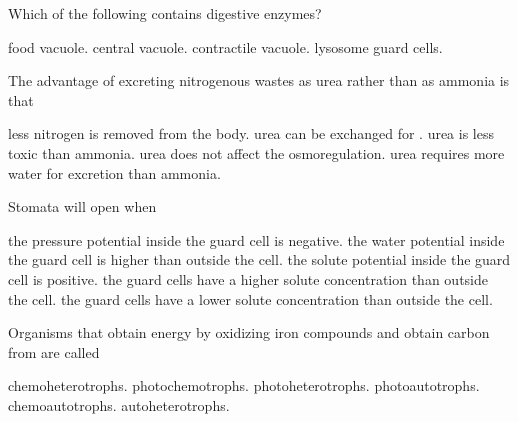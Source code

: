 \question
Which of the following contains digestive enzymes?

\begin{choices}
\choice food vacuole. 
\choice central vacuole. 
\choice contractile vacuole. 
\correctchoice lysosome 
\choice guard cells. 
\end{choices}

\question
The advantage of excreting nitrogenous wastes as urea rather than as ammonia is that

\begin{choices}
\choice less nitrogen is removed from the body. 
\choice urea can be exchanged for . 
\correctchoice urea is less toxic than ammonia. 
\choice urea does not affect the osmoregulation. 
\choice urea requires more water for excretion than ammonia. 
\end{choices}

\question
Stomata will open when  

\begin{choices}
\choice the pressure potential inside the guard cell is negative. 
\choice the water potential inside the guard cell is higher than outside the cell. 
\choice the solute potential inside the guard cell is positive. 
\correctchoice the guard cells have a higher solute concentration than outside the cell. 
\choice the guard cells have a lower solute concentration than outside the cell. 
\end{choices}

\question
Organisms that obtain energy by oxidizing iron compounds and obtain carbon from  are called

\begin{choices}
\choice chemoheterotrophs. 
\choice photochemotrophs. 
\choice photoheterotrophs. 
\choice photoautotrophs. 
\correctchoice chemoautotrophs. 
\choice autoheterotrophs. 
\end{choices}
